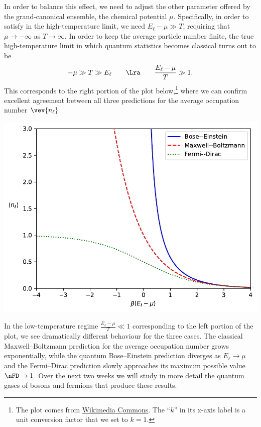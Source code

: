 In order to balance this effect, we need to adjust the other parameter offered by the grand-canonical ensemble, the chemical potential $\mu$.
Specifically, in order to satisfy  in the high-temperature limit, we need $E_{\ell} - \mu \gg T$, requiring that $\mu \to -\infty$ as $T \to \infty$.
In order to keep the average particle number finite, the true high-temperature limit in which quantum statistics becomes classical turns out to be
\begin{equation}
  -\mu \gg T \gg E_{\ell} \qquad \Lra \qquad \frac{E_{\ell} - \mu}{T} \gg 1.
\end{equation}
This corresponds to the right portion of the plot below,\footnote{The plot comes from \href{https://commons.wikimedia.org/wiki/File:Fermi-Dirac_Bose-Einstein_Maxwell-Boltzmann_statistics.svg}{Wikimedia Commons}.  The ``$k$'' in its x-axis label is a unit conversion factor that we set to $k = 1$.} where we can confirm excellent agreement between all three predictions for the average occupation number $\vev{n_{\ell}}$

\begin{center}\includegraphics[width=\textwidth]{figs/unit07_dist.pdf}\end{center}

In the low-temperature regime $\frac{E_{\ell} - \mu}{T} \ll 1$ corresponding to the left portion of the plot, we see dramatically different behaviour for the three cases.
The classical Maxwell--Boltzmann prediction for the average occupation number grows exponentially, while the quantum Bose--Einstein prediction diverges as $E_{\ell} \to \mu$ and the Fermi--Dirac prediction slowly approaches its maximum possible value $\nFD \to 1$.
Over the next two weeks we will study in more detail the quantum gases of bosons and fermions that produce these results.

